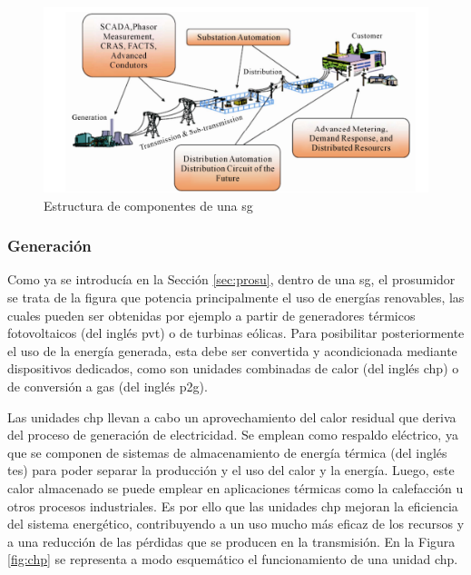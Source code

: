 \begin{figure}[h!]
  \centering
  \includegraphics[width=1\textwidth]{img/teoria/estructura_sg.png}
  \caption{Estructura de componentes de una \acrshort{sg} \cite{smartgrid_overview}}
  \label{fig:estructura_sg}
\end{figure}

\subsubsection{Generación}

Como ya se introducía en la Sección \ref{sec:prosu}, dentro de una \gls{sg}, el prosumidor se trata de la figura que potencia principalmente el uso de energías renovables, las cuales pueden ser obtenidas por ejemplo a partir de generadores térmicos fotovoltaicos (del inglés \gls{pvt}) o de turbinas eólicas. Para posibilitar posteriormente el uso de la energía generada, esta debe ser convertida y acondicionada mediante dispositivos dedicados, como son unidades combinadas de calor (del inglés \gls{chp}) o de conversión a gas (del inglés \gls{p2g}). \cite{transactive}

\vspace{3mm}

Las unidades \gls{chp} \cite{chp} llevan a cabo un aprovechamiento del calor residual que deriva del proceso de generación de electricidad. Se emplean como respaldo eléctrico, ya que se componen de sistemas de almacenamiento de energía térmica (del inglés \gls{tes}) para poder separar la producción y el uso del calor y la energía. Luego, este calor almacenado se puede emplear en aplicaciones térmicas como la calefacción u otros procesos industriales. Es por ello que las unidades \gls{chp} mejoran la eficiencia del sistema energético, contribuyendo a un uso mucho más eficaz de los recursos y a una reducción de las pérdidas que se producen en la transmisión. En la Figura \ref{fig:chp} se representa a modo esquemático el funcionamiento de una unidad \gls{chp}. \cite{chp2}

